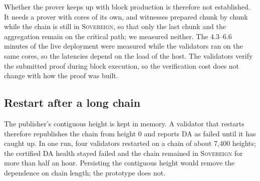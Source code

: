 Whether the prover keeps up with block production is therefore not established. It
needs a prover with cores of its own, and witnesses prepared chunk by chunk while the
chain is still in \textsc{Sovereign}, so that only the last chunk and the aggregation
remain on the critical path; we measured neither. The 4.3--6.6 minutes of the live
deployment were measured while the validators ran on the same cores, so the latencies
depend on the load of the host. The validators verify the submitted proof during
block execution, so the verification cost does not change with how the proof was
built.


\subsection*{Restart after a long chain}

The publisher's contiguous height is
kept in memory. A validator that restarts therefore republishes the chain from
height 0 and reports DA as failed until it has caught up. In one run, four
validators restarted on a chain of about 7{,}400 heights; the certified DA
health stayed failed and the chain remained in \textsc{Sovereign} for more than
half an hour. Persisting the contiguous height would remove the dependence on
chain length; the prototype does not.


